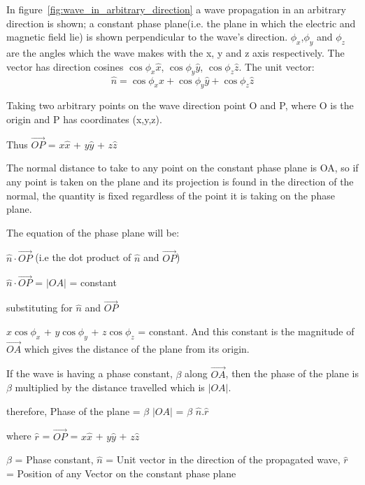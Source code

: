 In figure~\ref{fig:wave_in_arbitrary_direction} a wave propagation in an arbitrary direction is shown; a constant phase plane(i.e. the plane in which the electric and magnetic field lie) is shown perpendicular to the wave's direction.
$\phi_{x}$,$\phi_{y}$ and $\phi_{z}$ are the angles which the wave makes with the x, y and z axis respectively. 
The vector has direction cosines $\cos\phi_{x}\hat{x}$, $\cos\phi_{y}\hat{y}$, $\cos\phi_{z}\hat{z}$. The unit vector:
\begin{equation}
\hat{n} = \cos\phi_{x}\hat{x} + \cos\phi_{y}\hat{y} + \cos\phi_{z}\hat{z}
\end{equation}

Taking two arbitrary points on the wave direction point O and P, where O is the origin and P has coordinates (x,y,z).

Thus $\vec{OP}$ = $x\hat{x}$ + $y\hat{y}$ + $z\hat{z}$

The normal distance to take to any point on the constant phase plane is OA, so if any point is taken on the plane and its projection is found in the direction of the normal, the quantity is fixed regardless of the point it is taking on the phase plane.

The equation of the phase plane will be:

\begin{center}
$\hat{n}\cdot\vec{OP}$ (i.e the dot product of $\hat{n}$ and $\vec{OP}$)

$\hat{n}\cdot\vec{OP}$ = $\left|OA \right|$  = constant

substituting for $\hat{n}$ and $\vec{OP}$
\end{center}
$x\cos\phi_{x}$ + $y\cos\phi_{y}$ + $z\cos\phi_{z}$ = constant. And this constant is the magnitude of $\vec{OA}$ which gives the distance of the plane from its origin.

If the wave is having a phase constant, $\beta$ along $\vec{OA}$, then the phase of the plane is $\beta$ multiplied by the distance travelled which is $\lvert OA\rvert$.

\begin{center}
therefore, Phase of the plane = $\beta$ $\left|OA \right|$ = $\beta$ $\hat{n}.\hat{r}$

where $\hat{r}$ = $\vec{OP}$ = $x\hat{x}$ + $y\hat{y}$ + $z\hat{z}$

\end{center}
$\beta$ = Phase constant,
$\hat{n}$ = Unit vector in the direction of the propagated wave,
$\hat{r}$ = Position of any Vector on the constant phase plane


